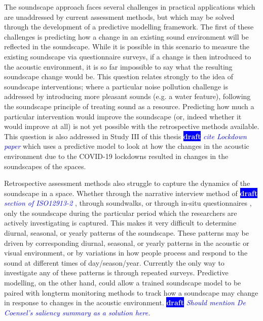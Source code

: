 \documentclass[twoside,fontsize=12pt,titlepage]{scrbook}
\newcommand{\remark}[3]{%
    {\colorbox{#2}{\sffamily\scriptsize\bfseries\textcolor{white}{#1}}}
    {\sffamily\small\itshape\textcolor{#2}{#3}}
}
\newcommand{\draft}[1]{\remark{draft}{blue}{#1}}
\begin{document}
 The soundscape approach faces several challenges in practical applications which are unaddressed by current assessment methods, but which may be solved through the development of a predictive modelling framework. The first of these challenges is predicting how a change in an existing sound environment will be reflected in the soundscape. While it is possible in this scenario to measure the existing soundscape via questionnaire surveys, if a change is then introduced to the acoustic environment, it is so far impossible to say what the resulting soundscape change would be. This question relates strongly to the idea of soundscape interventions; where a particular noise pollution challenge is addressed by introducing more pleasant sounds (e.g. a water feature), following the soundscape principle of treating sound as a resource. Predicting how much a particular intervention would improve the soundscape (or, indeed whether it would improve at all) is not yet possible with the retrospective methods available. This question is also addressed in Study III of this thesis \draft{cite Lockdown paper} which uses a predictive model to look at how the changes in the acoustic environment due to the COVID-19 lockdowns resulted in changes in the soundscapes of the spaces.

 Retrospective assessment methods also struggle to capture the dynamics of the soundscape in a space. Whether through the narrative interview method of \draft{section of ISO12913-2}, through soundwalks, or through in-situ questionnaires \citep{Mitchell2020Soundscape}, only the soundscape during the particular period which the researchers are actively investigating is captured. This makes it very difficult to determine diurnal, seasonal, or yearly patterns of the soundscape. These patterns may be driven by corresponding diurnal, seasonal, or yearly patterns in the acoustic or visual environment, or by variations in how people process and respond to the sound at different times of day/season/year. Currently the only way to investigate any of these patterns is through repeated surveys. Predictive modelling, on the other hand, could allow a trained soundscape model to be paired with longterm monitoring methods to track how a soundscape may change in response to changes in the acoustic environment. \draft{Should mention De Coensel's saliency summary as a solution here.}
\end{document}

